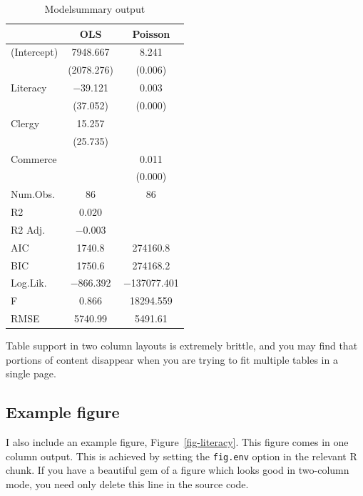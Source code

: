 \documentclass[
  Review,
  times,
  sageh]{sagej}
\begin{document}
\hypertarget{tbl-modelsummary}{}
\begin{table}
\caption{\label{tbl-modelsummary}Modelsummary output }\tabularnewline

\centering
\begin{tabular}[t]{lcc}
\toprule
  & OLS & Poisson\\
\midrule
(Intercept) & \num{7948.667} & \num{8.241}\\
 & (\num{2078.276}) & (\num{0.006})\\
Literacy & \num{-39.121} & \num{0.003}\\
 & (\num{37.052}) & (\num{0.000})\\
Clergy & \num{15.257} & \\
 & (\num{25.735}) & \\
Commerce &  & \num{0.011}\\
 &  & (\num{0.000})\\
\midrule
Num.Obs. & \num{86} & \num{86}\\
R2 & \num{0.020} & \\
R2 Adj. & \num{-0.003} & \\
AIC & \num{1740.8} & \num{274160.8}\\
BIC & \num{1750.6} & \num{274168.2}\\
Log.Lik. & \num{-866.392} & \num{-137077.401}\\
F & \num{0.866} & \num{18294.559}\\
RMSE & \num{5740.99} & \num{5491.61}\\
\bottomrule
\end{tabular}
\end{table}

Table support in two column layouts is extremely brittle, and you may
find that portions of content disappear when you are trying to fit
multiple tables in a single page.

\hypertarget{example-figure}{%
\subsection{Example figure}\label{example-figure}}

I also include an example figure, Figure~\ref{fig-literacy}. This figure
comes in one column output. This is achieved by setting the
\texttt{fig.env} option in the relevant R chunk. If you have a beautiful
gem of a figure which looks good in two-column mode, you need only
delete this line in the source code.
\end{document}
